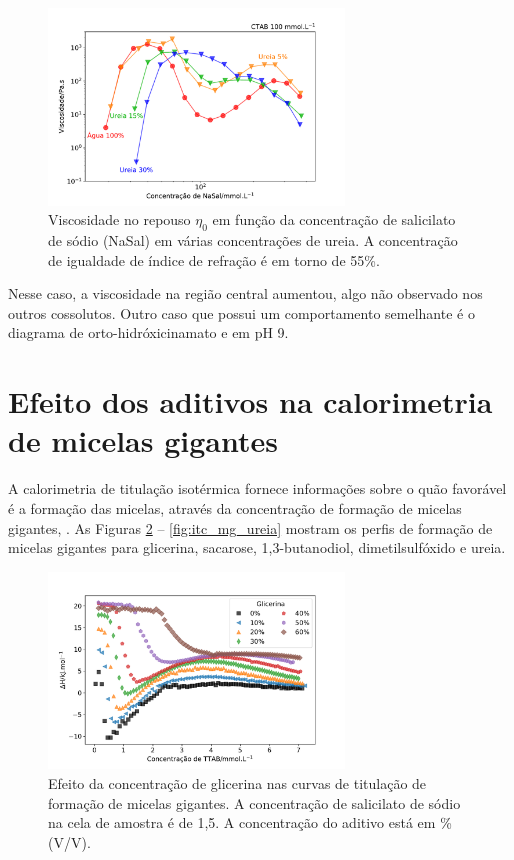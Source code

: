 			\begin{figure}[h]
				\centering
				\includegraphics[width=0.7\textwidth]{imagens/reologia/RH_ureia}
				\caption{Viscosidade no repouso \(\eta_0\) em função da concentração de salicilato de sódio (NaSal) em várias concentrações de ureia. A concentração de igualdade de índice de refração é em torno de 55\%.}
				\label{fig:rh_ureia}
			\end{figure}

			Nesse caso, a viscosidade na região central aumentou, algo não observado nos outros cossolutos. Outro caso que possui um comportamento semelhante é o diagrama de orto-hidróxicinamato e \CTAB{} em pH 9. %
		
		\FloatBarrier
		
		\section{Efeito dos aditivos na calorimetria de micelas gigantes}
		
			A calorimetria de titulação isotérmica fornece informações sobre o quão favorável é a formação das micelas, através da concentração de formação de micelas gigantes, \cwlm. As Figuras \ref{fig:itc_mg_glicerina} -- \ref{fig:itc_mg_ureia} mostram os perfis de formação de micelas gigantes para glicerina, sacarose, 1,3-butanodiol, dimetilsulfóxido e ureia.
		
			\begin{figure}[h]
				\centering
				\includegraphics[width=0.7\textwidth]{imagens/itc/ITC_MG_glic}
				\caption{Efeito da concentração de glicerina nas curvas de titulação de formação de micelas gigantes. A concentração de salicilato de sódio na cela de amostra é de 1,5\mM. A concentração do aditivo está em \% (V/V).}
				\label{fig:itc_mg_glicerina}
			\end{figure} 
			
